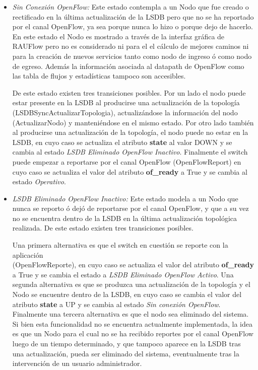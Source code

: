 \begin{itemize}
\item \textit{Sin Conexión OpenFlow:} Este estado contempla a un Nodo que fue creado o rectificado en la \'ultima actualización de la LSDB pero que no se ha reportado por el canal OpenFlow, ya sea porque nunca lo hizo o porque dejo de hacerlo. En este estado el Nodo es mostrado a trav\'es de la interfaz gr\'afica de RAUFlow pero no es considerado ni para el el c\'alculo de mejores caminos ni para la creaci\'on de nuevos servicios tanto como nodo de ingreso \'o como nodo de egreso. Adem\'as la informaci\'on asociada al datapath de OpenFlow como las tabla de flujos y estad\'isticas tampoco son accesibles.

De este estado existen tres transiciones posibles. Por un lado el nodo puede estar presente en la LSDB al producirse una actualizaci\'on de la topolog\'ia\\ (LSDBSyncActualizarTopologia), actualizándose la informaci\'on del nodo \\ (ActualizarNodo) y manteniéndose en el mismo estado. Por otro lado tambi\'en al producirse una actualizaci\'on de la topolog\'ia, el nodo puede no estar en la LSDB, en cuyo caso se actualiza el atributo \textbf{state} al valor DOWN y se cambia al estado \textit{LSDB Eliminado OpenFlow Inactivo}. Finalmente el switch puede empezar a reportarse por el canal OpenFlow (OpenFlowReport) en cuyo caso se actualiza el valor del atributo \textbf{of\_ready} a True y se cambia al estado \textit{Operativo}.  

\item \textit{LSDB Eliminado OpenFlow Inactivo:} Este estado modela a un Nodo que nunca se reporto \'o dej\'o de reportarse por el canal OpenFlow, y que a su vez no se encuentra dentro de la LSDB en la \'ultima actualizaci\'on topol\'ogica realizada. De este estado existen tres transiciones posibles.

Una primera alternativa es que el switch en cuesti\'on se reporte con la aplicaci\'on \\  
 (OpenFlowReporte), en cuyo caso se actualiza el valor del atributo \textbf{of\_ready} a True y se cambia el estado a \textit{LSDB Eliminado OpenFlow Activo}. Una segunda alternativa es que se produzca una actualizaci\'on de la topolog\'ia y el Nodo se encuentre dentro de la LSDB, en cuyo caso se cambia el valor del atributo \textbf{state} a UP y se cambia al estado \textit{Sin conexión OpenFlow}. Finalmente una tercera alternativa es que el nodo  sea eliminado del sistema. Si bien esta funcionalidad no se encuentra actualmente implementada, la idea es que un Nodo para el cual no se ha recibido reportes por el canal OpenFlow luego de un tiempo determinado, y que tampoco aparece en la LSDB tras una actualizaci\'on, pueda ser eliminado del sistema, eventualmente tras la intervenci\'on de un usuario administrador.
  
\end{itemize}


